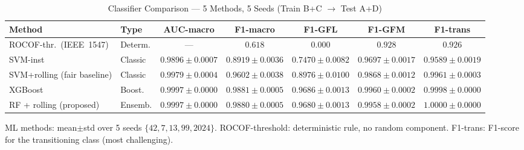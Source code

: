 \documentclass[journal]{IEEEtran}
\begin{document}
\begin{table}[!t]
\renewcommand{\arraystretch}{1.25}
\caption{Classifier Comparison --- 5 Methods, 5 Seeds (Train B+C $\rightarrow$ Test A+D)}
\label{tab:results_main}
\centering
\begin{tabular}{@{}llccccc@{}}
\toprule
Method & Type & AUC-macro & F1-macro & F1-GFL & F1-GFM & F1-trans \\
\midrule
ROCOF-thr.\ (IEEE~1547) \cite{b_ieee1547}
  & Determ. & ---                   & $0.618$               & $0.000$             & $0.928$             & $0.926$ \\
SVM-inst \cite{b_svm_islanding}
  & Classic & $0.9896\pm0.0007$     & $0.8919\pm0.0036$     & $0.7470\pm0.0082$   & $0.9697\pm0.0017$   & $0.9589\pm0.0019$ \\
SVM+rolling (fair baseline)
  & Classic & $0.9979\pm0.0004$     & $0.9602\pm0.0038$     & $0.8976\pm0.0100$   & $0.9868\pm0.0012$   & $0.9961\pm0.0003$ \\
XGBoost \cite{b_xgb_islanding}
  & Boost.  & $0.9997\pm0.0000$     & $0.9881\pm0.0005$     & $0.9686\pm0.0013$   & $0.9960\pm0.0002$   & $0.9998\pm0.0000$ \\
RF + rolling (proposed)
  & Ensemb. & $\mathbf{0.9997\pm0.0000}$ & $\mathbf{0.9880\pm0.0005}$ & $\mathbf{0.9680\pm0.0013}$ & $\mathbf{0.9958\pm0.0002}$ & $\mathbf{1.0000\pm0.0000}$ \\
\bottomrule
\end{tabular}
\begin{tablenotes}
\small
\item ML methods: mean$\pm$std over 5 seeds $\{42, 7, 13, 99, 2024\}$.
      ROCOF-threshold: deterministic rule, no random component.
      F1-trans: F1-score for the transitioning class (most challenging).
\end{tablenotes}
\end{table}
\end{document}
